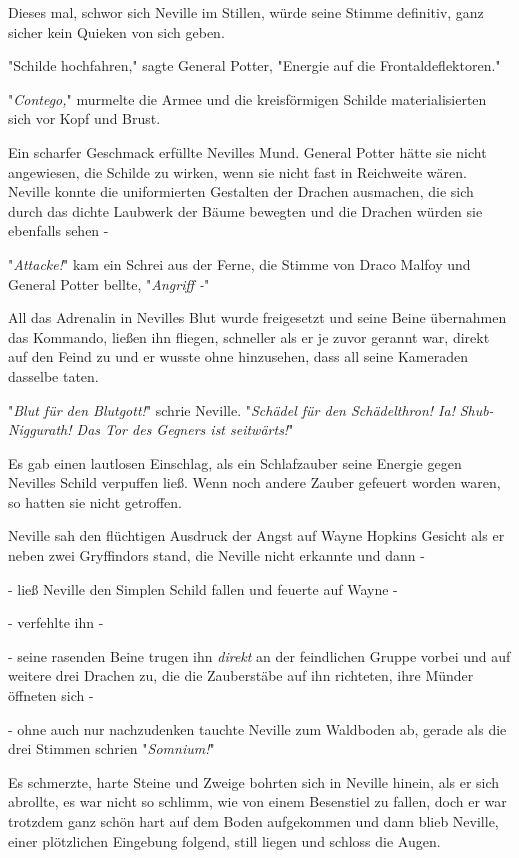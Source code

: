 {Dieses mal, schwor sich Neville im Stillen, würde seine Stimme definitiv, ganz sicher kein Quieken von sich geben.

"Schilde hochfahren," sagte General Potter, "Energie auf die Frontaldeflektoren."

"\emph{Contego,}" murmelte die Armee und die kreisförmigen Schilde materialisierten sich vor Kopf und Brust.

Ein scharfer Geschmack erfüllte Nevilles Mund. General Potter hätte sie nicht angewiesen, die Schilde zu wirken, wenn sie nicht fast in Reichweite wären. Neville konnte die uniformierten Gestalten der Drachen ausmachen, die sich durch das dichte Laubwerk der Bäume bewegten und die Drachen würden sie ebenfalls sehen -

"\emph{Attacke!}" kam ein Schrei aus der Ferne, die Stimme von Draco Malfoy und General Potter bellte, "\emph{Angriff -}"

All das Adrenalin in Nevilles Blut wurde freigesetzt und seine Beine übernahmen das Kommando, ließen ihn fliegen, schneller als er je zuvor gerannt war, direkt auf den Feind zu und er wusste ohne hinzusehen, dass all seine Kameraden dasselbe taten.

"\emph{Blut für den Blutgott!}" schrie Neville. "\emph{Schädel für den Schädelthron! Ia!} \emph{Shub-Niggurath! Das Tor des Gegners ist seitwärts!}"

Es gab einen lautlosen Einschlag, als ein Schlafzauber seine Energie gegen Nevilles Schild verpuffen ließ. Wenn noch andere Zauber gefeuert worden waren, so hatten sie nicht getroffen.

Neville sah den flüchtigen Ausdruck der Angst auf Wayne Hopkins Gesicht als er neben zwei Gryffindors stand, die Neville nicht erkannte und dann -

- ließ Neville den Simplen Schild fallen und feuerte auf Wayne -

- verfehlte ihn -

- seine rasenden Beine trugen ihn \emph{direkt} an der feindlichen Gruppe vorbei und auf weitere drei Drachen zu, die die Zauberstäbe auf ihn richteten, ihre Münder öffneten sich -

- ohne auch nur nachzudenken tauchte Neville zum Waldboden ab, gerade als die drei Stimmen schrien "\emph{Somnium!}"

Es schmerzte, harte Steine und Zweige bohrten sich in Neville hinein, als er sich abrollte, es war nicht so schlimm, wie von einem Besenstiel zu fallen, doch er war trotzdem ganz schön hart auf dem Boden aufgekommen und dann blieb Neville, einer plötzlichen Eingebung folgend, still liegen und schloss die Augen.

}
